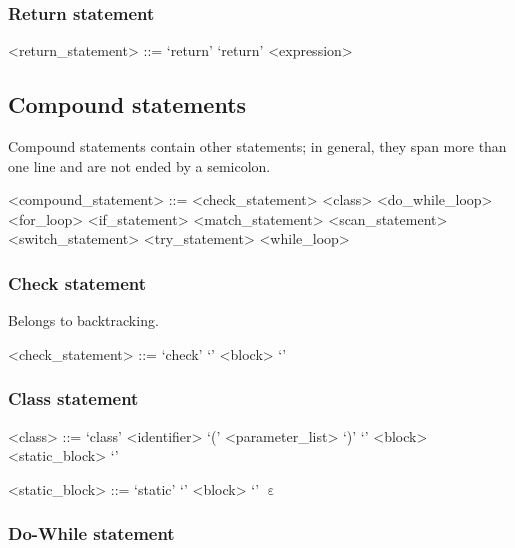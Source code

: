 %
\subsubsection{Return statement}

\begin{grammar}
<return_statement> ::= `return'
\alt `return' <expression>
\end{grammar}

%
%
\clearpage
\subsection{Compound statements}

Compound statements contain other statements; in general, they span more than one line and are not ended by a semicolon.

\begin{grammar}
<compound_statement> ::= <check_statement>
\alt <class>
\alt <do_while_loop>
\alt <for_loop>
\alt <if_statement>
\alt <match_statement>
\alt <scan_statement>
\alt <switch_statement>
\alt <try_statement>
\alt <while_loop>
\end{grammar}

%
\subsubsection{Check statement}

Belongs to backtracking.

\begin{grammar}
<check_statement> ::= `check' `{' <block> `}'
\end{grammar}

%
\subsubsection{Class statement}

\begin{grammar}
<class> ::= `class' <identifier> `(' <parameter_list> `)' `{' <block> <static_block> `}'

<static_block> ::= `static' `{' <block> `}'
\alt $\upepsilon$
\end{grammar}

%
\subsubsection{Do-While statement}

